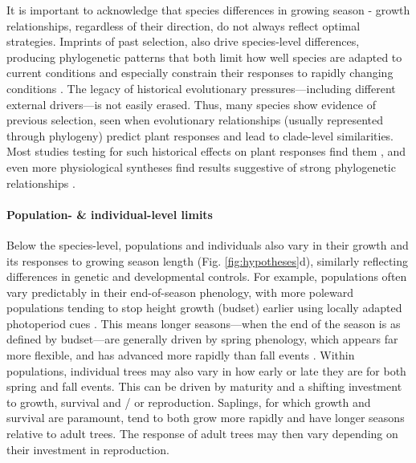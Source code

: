 \documentclass[11pt]{article}
\begin{document}
It is important to acknowledge that species differences in growing season - growth relationships, regardless of their direction, do not always reflect optimal strategies. Imprints of past selection, also drive species-level differences, producing phylogenetic patterns that both limit how well species are adapted to current conditions and especially constrain their responses to rapidly changing conditions \citep{Ackerly:2009ly,phenophylo}. The legacy of historical evolutionary pressures---including different external drivers---is not easily erased.  Thus, many species show evidence of previous selection, seen when evolutionary relationships (usually represented through phylogeny) predict plant responses and lead to clade-level similarities. Most studies testing for such historical effects on plant responses find them \citep[e.g.,][]{phenophylo}, and even more physiological syntheses find results suggestive of strong phylogenetic relationships \citep[though they are more rarely formally tested, e.g.,][]{way2010differential}. 

\paragraph{Population- \& individual-level limits}
Below the species-level, populations and individuals also vary in their growth and its responses to growing season length (Fig. \ref{fig:hypotheses}d), similarly reflecting differences in genetic and developmental controls. For example, populations often vary predictably in their end-of-season phenology, with more poleward populations tending to stop height growth (budset) earlier using locally adapted photoperiod cues \citep{soolanayakanahally2013timing,aitken2016}. This means longer seasons---when the end of the season is as defined by budset---are generally driven by spring phenology, which appears far more flexible, and has advanced more rapidly than fall events \citep{aitken2016}. Within populations, individual trees may also vary in how early or late they are for both spring and fall events. This can be driven by maturity and a shifting investment to growth, survival and / or reproduction. Saplings, for which growth and survival are paramount, tend to both grow more rapidly and have longer seasons relative to adult trees. The response of adult trees may then vary depending on their investment in reproduction. 
\end{document}
